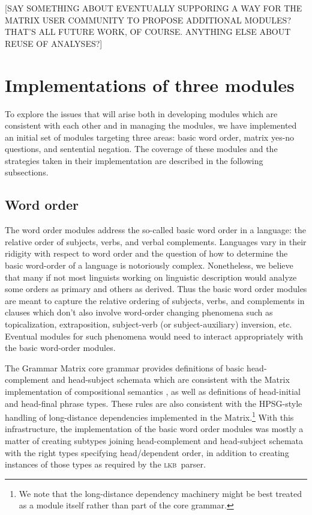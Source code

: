 \documentclass[11pt]{article}
\newcommand{\lkb}{\textsc{lkb}}
\begin{document}
[SAY SOMETHING ABOUT EVENTUALLY SUPPORING A WAY FOR THE MATRIX USER
COMMUNITY TO PROPOSE ADDITIONAL MODULES?  THAT'S ALL FUTURE WORK, OF
COURSE.  ANYTHING ELSE ABOUT REUSE OF ANALYSES?]


\section{Implementations of three modules}

To explore the issues that will arise both in developing modules which
are consistent with each other and in managing the modules, we have
implemented an initial set of modules targeting three areas: basic
word order, matrix yes-no questions, and sentential negation.  The coverage
of these modules and the strategies taken in their implementation are
described in the following subsections.

\subsection{Word order}

The word order modules address the so-called basic word order in
a language: the relative order of subjects, verbs, and verbal complements.
Languages vary in their ridigity with respect to word order and the
question of how to determine the basic word-order of a language is 
notoriously complex.  Nonetheless, we believe that many if not most
linguists working on linguistic description would analyze some orders
as primary and others as derived.  Thus the basic word order modules
are meant to capture the relative ordering of subjects, verbs, and complements
in clauses which don't also involve word-order changing phenomena
such as topicalization, extraposition, subject-verb (or subject-auxiliary)
inversion, etc.  Eventual modules for such phenomena would need to
interact appropriately with the basic word-order modules.

The Grammar Matrix core grammar provides definitions of basic
head-complement and head-subject schemata which are consistent with
the Matrix implementation of compositional semantics
\cite{Fli:Ben:03}, as well as definitions of head-initial and
head-final phrase types.  These rules are also consistent with the
HPSG-style handling of long-distance dependencies implemented in the
Matrix.\footnote{We note that the long-distance dependency machinery
might be best treated as a module itself rather than part of the core
grammar.}  With this infrastructure, the implementation of the basic
word order modules was mostly a matter of creating subtypes joining
head-complement and head-subject schemata with the right types
specifying head/dependent order, in addition to creating instances of
those types as required by the \lkb\ parser.
\end{document}
